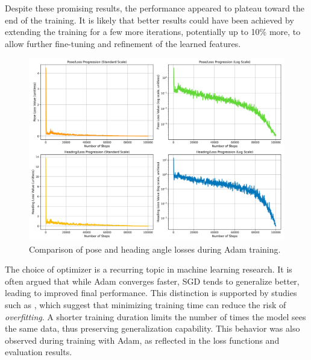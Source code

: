 Despite these promising results, the performance appeared to plateau toward the end of the training. It is likely that better results could have been achieved by extending the training for a few more iterations, potentially up to 10\% more, to allow further fine-tuning and refinement of the learned features.
\begin{figure}[H]
    \centering
    \includegraphics[width=1\linewidth]{LateX//figs/BEV2_l1sDEG_pose_heading_loss_comparison.png}
    \caption{Comparison of pose and heading angle losses during Adam training.}
    \label{fig:adam_loss_comparison}
\end{figure}

The choice of optimizer is a recurring topic in machine learning research. It is often argued that while Adam converges faster, SGD tends to generalize better, leading to improved final performance. This distinction is supported by studies such as \cite{DBLP:journals/corr/abs-1910-05446}, which suggest that minimizing training time can reduce the risk of \textit{overfitting}. A shorter training duration limits the number of times the model sees the same data, thus preserving generalization capability. This behavior was also observed during training with Adam, as reflected in the loss functions and evaluation results.

